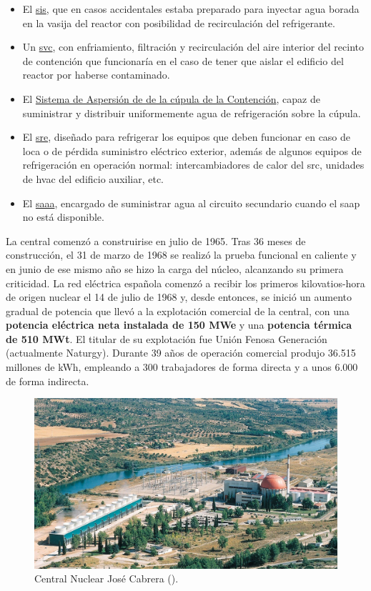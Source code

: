 \begin{itemize}
  \item El \underline{\acrlong{sis}}, que en casos accidentales estaba preparado para inyectar agua borada en la vasija del reactor con posibilidad de recirculación del refrigerante.
  \item Un \underline{\acrlong{svc}}, con enfriamiento, filtración y recirculación del aire interior del recinto de contención que funcionaría en el caso de tener que aislar el edificio del reactor por haberse contaminado.
  \item El \underline{Sistema de Aspersión de de la cúpula de la Contención}, capaz de suministrar y distribuir uniformemente agua de refrigeración sobre la cúpula.
  \item El \underline{\acrlong{sre}}, diseñado para refrigerar los equipos que deben funcionar en caso de \acrshort{loca} o de pérdida suministro eléctrico exterior, además de algunos equipos de refrigeración en operación normal: intercambiadores de calor del \acrlong{src}, unidades de \acrshort{hvac} del edificio auxiliar, etc.
  \item El \underline{\acrlong{saaa}}, encargado de suministrar agua al circuito secundario cuando el \acrlong{saap} no está disponible.
\end{itemize}

La central comenzó a construirise en julio de 1965. Tras 36 meses de construcción, el 31 de marzo de 1968 se realizó la prueba funcional en caliente y en junio de ese mismo año se hizo la carga del núcleo, alcanzando su primera criticidad. La red eléctrica española comenzó a recibir los primeros kilovatios-hora de origen nuclear el 14 de julio de 1968 y, desde entonces, se inició un aumento gradual de potencia que llevó a la explotación comercial de la central, con una \textbf{potencia eléctrica neta instalada de 150 MWe} y una \textbf{potencia térmica de 510 MWt}. El titular de su explotación fue Unión Fenosa Generación (actualmente Naturgy). Durante 39 años de operación comercial produjo 36.515 millones de kWh, empleando a 300 trabajadores de forma directa y a unos 6.000 de forma indirecta.

\begin{figure}[h]
    \centering
    \includegraphics[width=1\textwidth]{content/figures/zorita.jpg}
    \caption{Central Nuclear José Cabrera (\cite{sne_recursos_prensa}).}
    \label{fig:zorita}
\end{figure}

